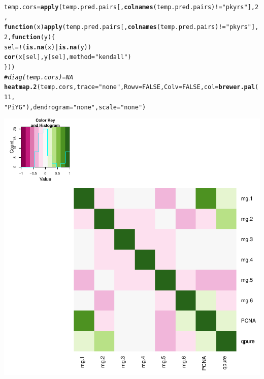 \documentclass{article}\usepackage[]{graphicx}\usepackage[]{color}
\makeatletter
\def\maxwidth{ %
  \ifdim\Gin@nat@width>\linewidth
    \linewidth
  \else
    \Gin@nat@width
  \fi
}
\newcommand{\hlnum}[1]{\textcolor[rgb]{0.686,0.059,0.569}{#1}}%
\newcommand{\hlstr}[1]{\textcolor[rgb]{0.192,0.494,0.8}{#1}}%
\newcommand{\hlcom}[1]{\textcolor[rgb]{0.678,0.584,0.686}{\textit{#1}}}%
\newcommand{\hlopt}[1]{\textcolor[rgb]{0,0,0}{#1}}%
\newcommand{\hlstd}[1]{\textcolor[rgb]{0.345,0.345,0.345}{#1}}%
\newcommand{\hlkwa}[1]{\textcolor[rgb]{0.161,0.373,0.58}{\textbf{#1}}}%
\newcommand{\hlkwb}[1]{\textcolor[rgb]{0.69,0.353,0.396}{#1}}%
\newcommand{\hlkwc}[1]{\textcolor[rgb]{0.333,0.667,0.333}{#1}}%
\newcommand{\hlkwd}[1]{\textcolor[rgb]{0.737,0.353,0.396}{\textbf{#1}}}%
\newenvironment{kframe}{%
 \def\at@end@of@kframe{}%
 \ifinner\ifhmode%
  \def\at@end@of@kframe{\end{minipage}}%
  \begin{minipage}{\columnwidth}%
 \fi\fi%
 \def\FrameCommand##1{\hskip\@totalleftmargin \hskip-\fboxsep
 \colorbox{shadecolor}{##1}\hskip-\fboxsep
     \hskip-\linewidth \hskip-\@totalleftmargin \hskip\columnwidth}%
 \MakeFramed {\advance\hsize-\width
   \@totalleftmargin\z@ \linewidth\hsize
   \@setminipage}}%
 {\par\unskip\endMakeFramed%
 \at@end@of@kframe}
\newenvironment{knitrout}{}{} %
\makeatother
\begin{document}
\begin{knitrout}
{}


\begin{kframe}\begin{alltt}
\hlstd{temp.cors} \hlkwb{=} \hlkwd{apply}\hlstd{(temp.pred.pairs[,} \hlkwd{colnames}\hlstd{(temp.pred.pairs)} \hlopt{!=} \hlstr{"pkyrs"}\hlstd{],} \hlnum{2}\hlstd{,}
    \hlkwa{function}\hlstd{(}\hlkwc{x}\hlstd{)} \hlkwd{apply}\hlstd{(temp.pred.pairs[,} \hlkwd{colnames}\hlstd{(temp.pred.pairs)} \hlopt{!=} \hlstr{"pkyrs"}\hlstd{],}
        \hlnum{2}\hlstd{,} \hlkwa{function}\hlstd{(}\hlkwc{y}\hlstd{) \{}
            \hlstd{sel} \hlkwb{=} \hlopt{!}\hlstd{(}\hlkwd{is.na}\hlstd{(x)} \hlopt{|} \hlkwd{is.na}\hlstd{(y))}
            \hlkwd{cor}\hlstd{(x[sel], y[sel],} \hlkwc{method} \hlstd{=} \hlstr{"kendall"}\hlstd{)}
        \hlstd{\}))}
\hlcom{# diag(temp.cors) = NA}
\hlkwd{heatmap.2}\hlstd{(temp.cors,} \hlkwc{trace} \hlstd{=} \hlstr{"none"}\hlstd{,} \hlkwc{Rowv} \hlstd{=} \hlnum{FALSE}\hlstd{,} \hlkwc{Colv} \hlstd{=} \hlnum{FALSE}\hlstd{,} \hlkwc{col} \hlstd{=} \hlkwd{brewer.pal}\hlstd{(}\hlnum{11}\hlstd{,}
    \hlstr{"PiYG"}\hlstd{),} \hlkwc{dendrogram} \hlstd{=} \hlstr{"none"}\hlstd{,} \hlkwc{scale} \hlstd{=} \hlstr{"none"}\hlstd{)}
\end{alltt}
\end{kframe}

{\centering \includegraphics[width=\maxwidth]{figure/metagene-pairs-6} 

}



\end{knitrout}
\end{document}
